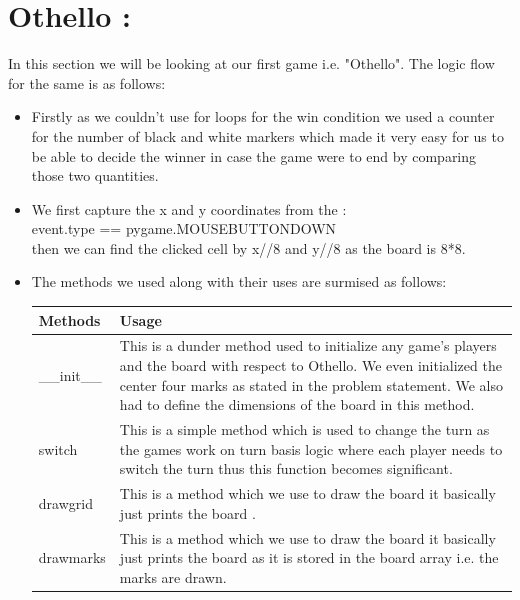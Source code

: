 \documentclass{article}
\begin{document}
\section*{Othello :}
In this section we will be looking at our first game i.e. "Othello". The logic flow for the same is as follows:\\

\begin{itemize}[leftmargin=1.5em, topsep=0pt, itemsep=0pt]
    \item Firstly as we couldn't use for loops for the win condition we used a counter for the number of black and white markers which made it very easy for us to be able to decide the winner in case the game were to end by comparing those two quantities.\\
    
    \item We first capture the x and y coordinates from the :  \\
    event.type == pygame.MOUSEBUTTONDOWN 
    \\then we can find the clicked cell by x//8 and y//8 as the board is 8*8.\\
    \item  The methods we used along with their uses are surmised as follows:
        \begin{table}[H]
\centering
\begin{tabular}{|p{4cm}|p{9cm}|}
\hline
\textbf{Methods} & \textbf{Usage} \\ 
\hline

\_\_init\_\_
&
This is a dunder method used to initialize any game's players and the board with respect to Othello. We even initialized the center four marks as stated in the problem statement. We also had to define the dimensions of the board in this method. \\

\hline
switch 

 & This is a simple method which is used to change the turn as the games work on turn basis logic where each player needs to switch the turn thus this function becomes significant.\\
 \hline
drawgrid

 & This is a method which we use to draw the board it basically just prints the board .\\
\hline
drawmarks

 & This is a method which we use to draw the board it basically just prints the board as it is stored in the board array i.e. the marks are drawn.\\
\hline


\end{tabular}
\end{table}
\end{itemize}
\end{document}
